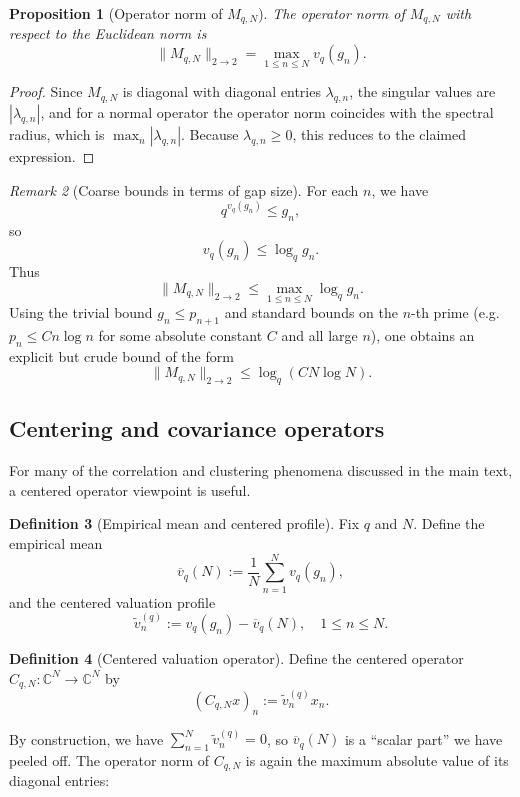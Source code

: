 \documentclass[11pt]{article}
\theoremstyle{definition}
\newtheorem{definition}{Definition}[section]
\theoremstyle{plain}
\newtheorem{proposition}[definition]{Proposition}
\theoremstyle{remark}
\newtheorem{remark}[definition]{Remark}
\newcommand{\1}{\mathbb{1}}
\begin{document}
\begin{proposition}[Operator norm of \(M_{q,N}\)]
The operator norm of \(M_{q,N}\) with respect to the Euclidean norm is
\[
  \|M_{q,N}\|_{2\to 2} = \max_{1\le n\le N} v_q(g_n).
\]
\end{proposition}

\begin{proof}
Since \(M_{q,N}\) is diagonal with diagonal entries \(\lambda_{q,n}\), the singular values are \(|\lambda_{q,n}|\), and for a normal operator the operator norm coincides with the spectral radius, which is \(\max_n |\lambda_{q,n}|\). Because \(\lambda_{q,n} \ge 0\), this reduces to the claimed expression.
\end{proof}

\begin{remark}[Coarse bounds in terms of gap size]
For each \(n\), we have
\[
  q^{v_q(g_n)} \le g_n,
\]
so
\[
  v_q(g_n) \le \log_q g_n.
\]
Thus
\[
  \|M_{q,N}\|_{2\to 2} \le \max_{1\le n\le N} \log_q g_n.
\]
Using the trivial bound \(g_n\le p_{n+1}\) and standard bounds on the \(n\)-th prime (e.g.\ \(p_n \le C n\log n\) for some absolute constant \(C\) and all large \(n\)), one obtains an explicit but crude bound of the form
\[
  \|M_{q,N}\|_{2\to 2} \le \log_q(C N\log N).
\]
\end{remark}

\subsection{Centering and covariance operators}

For many of the correlation and clustering phenomena discussed in the main text, a centered operator viewpoint is useful.

\begin{definition}[Empirical mean and centered profile]
Fix \(q\) and \(N\). Define the empirical mean
\[
  \overline{v}_q(N) := \frac{1}{N}\sum_{n=1}^N v_q(g_n),
\]
and the centered valuation profile
\[
  \tilde{v}^{(q)}_n := v_q(g_n) - \overline{v}_q(N),\quad 1\le n\le N.
\]
\end{definition}

\begin{definition}[Centered valuation operator]
Define the centered operator \(C_{q,N}: \mathbb{C}^N \to \mathbb{C}^N\) by
\[
  (C_{q,N} x)_n := \tilde{v}^{(q)}_n x_n.
\]
\end{definition}

By construction, we have \(\sum_{n=1}^N \tilde{v}^{(q)}_n = 0\), so \(\overline{v}_q(N)\) is a ``scalar part'' we have peeled off. The operator norm of \(C_{q,N}\) is again the maximum absolute value of its diagonal entries:
\end{document}
